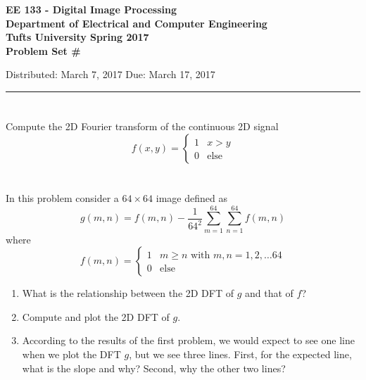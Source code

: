 \documentclass[11pt]{article}
\begin{document}
\begin{center}
  \begin{large}
    \textbf{  EE 133 - Digital Image Processing \\
      Department of Electrical and Computer Engineering \\
      Tufts University Spring 2017 \\
      Problem Set \#\thehw}
  \end{large}
\end{center}

\noindent Distributed: March 7, 2017 \hfill Due: March 17, 2017

\hrule 
\vspace{.2in}

\section{}\label{ps04p01}
Compute the 2D Fourier transform of the continuous 2D signal
\begin{displaymath}
	f(x,y)  = 
	\begin{cases}
		1 & x>y \\
		0 & \text{else}
	\end{cases}
\end{displaymath}


\section{}\label{ps04p02}
In this problem consider a $64 \times 64$ image defined as
\begin{displaymath}
	g(m,n) = f(m,n) - \frac{1}{64^2}\sum_{m=1}^{64}\sum_{n=1}^{64}f(m,n)
\end{displaymath}
where
\begin{equation}
	\label{eq:2}
	f(m,n) =
	\begin{cases}
		1 & m \geq n \text{ with } m,n = 1, 2, \dots 64 \\
		0 & \text{else}
	\end{cases}
\end{equation}
\begin{enumerate}
	\item What is the relationship between the 2D DFT of $g$ and that of $f$? 
	\item Compute and plot the 2D DFT of $g$.
	
	\item According to the results of the first problem, we would expect to see one line when we plot the DFT $g$, but we see three lines.  First, for the expected line, what is the slope and why?  Second, why the other two lines? 
\end{enumerate}
\end{document}
